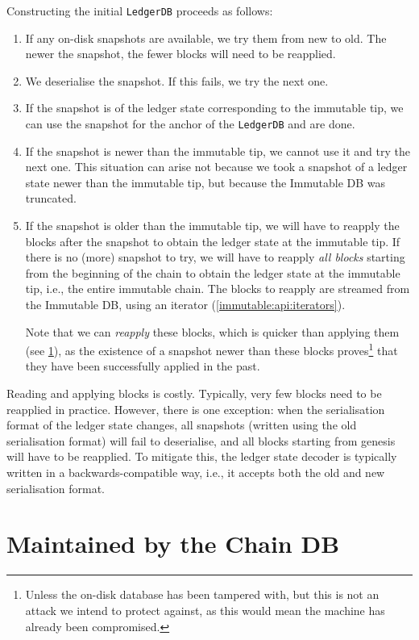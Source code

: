 Constructing the initial \lstinline!LedgerDB! proceeds as follows:
\begin{enumerate}
\item If any on-disk snapshots are available, we try them from new to old. The
  newer the snapshot, the fewer blocks will need to be reapplied.
\item We deserialise the snapshot. If this fails, we try the next one.
\item If the snapshot is of the ledger state corresponding to the immutable tip,
  we can use the snapshot for the anchor of the \lstinline!LedgerDB! and are
  done.
\item If the snapshot is newer than the immutable tip, we cannot use it and try
  the next one. This situation can arise not because we took a snapshot of a
  ledger state newer than the immutable tip, but because the Immutable DB was
  truncated.
\item If the snapshot is older than the immutable tip, we will have to reapply
  the blocks after the snapshot to obtain the ledger state at the immutable tip.
  If there is no (more) snapshot to try, we will have to reapply \emph{all
  blocks} starting from the beginning of the chain to obtain the ledger state at
  the immutable tip, i.e., the entire immutable chain. The blocks to reapply are
  streamed from the Immutable DB, using an iterator
  (\cref{immutable:api:iterators}).

  Note that we can \emph{reapply} these blocks, which is quicker than applying
  them (see \cref{ledgerdb:lgrdb}), as the existence of a snapshot newer than
  these blocks proves\footnote{Unless the on-disk database has been tampered
  with, but this is not an attack we intend to protect against, as this would
  mean the machine has already been compromised.} that they have been
  successfully applied in the past.
\end{enumerate}
%
Reading and applying blocks is costly. Typically, very few blocks need to be
reapplied in practice. However, there is one exception: when the serialisation
format of the ledger state changes, all snapshots (written using the old
serialisation format) will fail to deserialise, and all blocks starting from
genesis will have to be reapplied. To mitigate this, the ledger state decoder is
typically written in a backwards-compatible way, i.e., it accepts both the old
and new serialisation format.

\section{Maintained by the Chain DB}
\label{ledgerdb:lgrdb}

